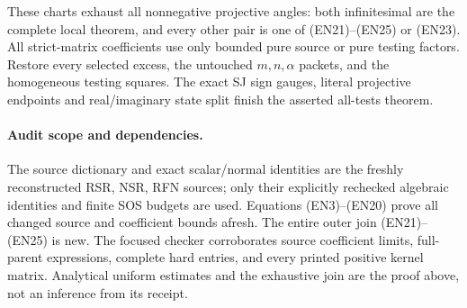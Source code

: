 These charts exhaust all nonnegative projective angles:
both infinitesimal are the complete local theorem, and every other
pair is one of (EN21)--(EN25) or (EN23).
All strict-matrix coefficients use only bounded pure source or
pure testing factors. Restore every selected excess, the untouched
$m,n,\alpha$ packets, and the homogeneous testing squares.
The exact SJ sign gauges, literal projective endpoints and
real/imaginary state split finish the asserted all-tests theorem.

\paragraph{Audit scope and dependencies.}
The source dictionary and exact scalar/normal identities are the
freshly reconstructed RSR, NSR, RFN sources; only their explicitly
rechecked algebraic identities and finite SOS budgets are used.
Equations (EN3)--(EN20) prove all changed source and coefficient
bounds afresh. The entire outer join (EN21)--(EN25) is new.
The focused checker corroborates source coefficient limits,
full-parent expressions, complete hard entries, and every printed
positive kernel matrix. Analytical uniform estimates and the
exhaustive join are the proof above, not an inference from its receipt.
